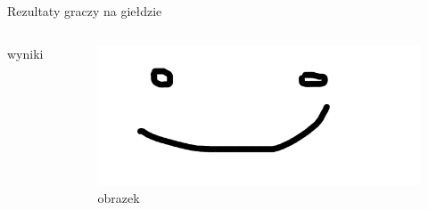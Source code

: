 \begin{frame}{Rezultaty graczy na giełdzie}
    \begin{columns}[t]
            wyniki
        \centering
        \begin{figure}
            \centering
            \includegraphics[width=1\textwidth]{images/obrazek.png}
            \caption{obrazek}
            \label{fig:pic}
        \end{figure}    
    \end{columns}
\end{frame}
